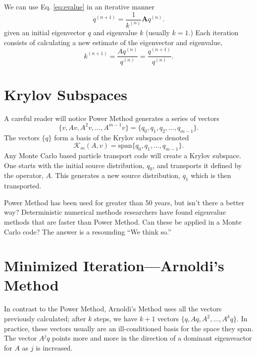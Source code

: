 \documentclass[11pt]{article}
\begin{document}
We can use Eq. \ref{eq:evalue} in an iterative manner
\begin{equation}
    q^{(n+1)} = \frac{1}{k^{(n)}}\mathbf{A}q^{(n)}. 
\end{equation}
given an initial eigenvector $q$ and eigenvalue $k$ (usually $k=1$.)  Each iteration consists of calculating a new estimate of the eigenvector and eigenvalue,
\begin{equation}
    k^{(n+1)} = \frac{Aq^{(n)}}{q^{(n)}} = \frac{q^{(n+1)}}{q^{(n)}}.
\end{equation}

\section{Krylov Subspaces}
A careful reader will notice Power Method generates a series of vectors
\begin{equation}
    \{v, Av, A^2v, \ldots, A^{m-1}v\} = \{q_0, q_1, q_2, \ldots, q_{m-1}\}.
\end{equation}
The vectors $\{q\}$ form a basis of the Krylov subspace denoted
\begin{equation}
    \mathcal{K}_m(A,v) = \mathrm{span} \{q_0, q_1, \ldots, q_{m-1}\}.
\end{equation}
Any Monte Carlo based particle transport code will create a Krylov subspace.  One starts with the initial source distribution, $q_0$, and transports it defined by the operator, $A$.  This generates a new source distribution, $q_1$ which is then transported.  

Power Method has been used for greater than 50 years, but isn't there a better way?  Deterministic numerical methods researchers have found eigenvalue methods that are faster than Power Method.  Can these be applied in a Monte Carlo code?  The answer is a resounding ``We think so.''

\section{Minimized Iteration---Arnoldi's Method}
In contrast to the Power Method, Arnoldi's Method uses all the vectors previously calculated; after $k$ steps, we have $k+1$ vectors $\{q, Aq, A^2,\ldots, A^kq\}$.  In practice, these vectors usually are an ill-conditioned basis for the space they span.  The vector $A^jq$ points more and more in the direction of a dominant eigenveactor for $A$ as $j$ is increased.  
\end{document}
